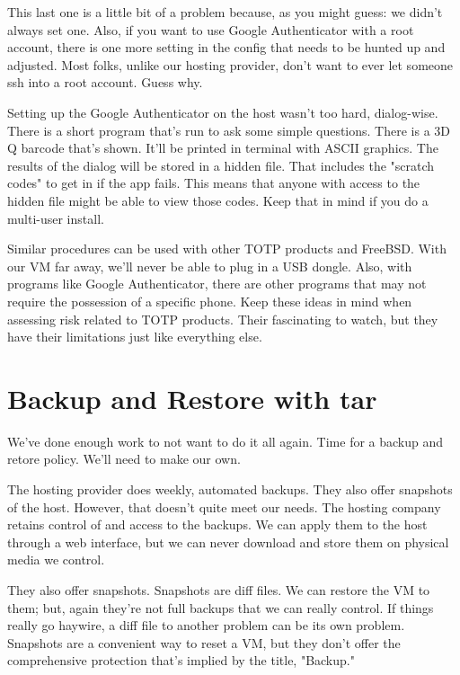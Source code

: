 This last one is a little bit of a problem because, as you might guess:  we didn't always set one.  Also, if you want to use Google Authenticator with a root account, there is one more setting in the config that needs to be hunted up and adjusted.  Most folks, unlike our hosting provider, don't want to ever let someone ssh into a root account.  Guess why.

Setting up the Google Authenticator on the host wasn't too hard, dialog-wise.  There is a short program that's run to ask some simple questions.  There is a 3D Q barcode that's shown.  It'll be printed in terminal with ASCII graphics.  The results of the dialog will be stored in a hidden file.  That includes the "scratch codes" to get in if the app fails.  This means that anyone with access to the hidden file might be able to view those codes.  Keep that in mind if you do a multi-user install.

Similar procedures can be used with other TOTP products and FreeBSD.  With our VM far away, we'll never be able to plug in a USB dongle.  Also, with programs like Google Authenticator, there are other programs that may not require the possession of a specific phone.  Keep these ideas in mind when assessing risk related to TOTP products.  Their fascinating to watch, but they have their limitations just like everything else.

\section{Backup and Restore with tar}


We've done enough work to not want to do it all again.  Time for a \gls{backup} and retore policy.  We'll need to make our own.

The hosting provider does weekly, automated backups.  They also offer snapshots of the host.  However, that doesn't quite meet our needs.  The hosting company retains control of and access to the backups.  We can apply them to the host through a web interface, but we can never download and store them on physical media we control.

They also offer snapshots.  Snapshots are diff files.  We can restore the VM to them; but, again they're not full backups that we can really control.  If things really go haywire, a diff file to another problem can be its own problem.  Snapshots are a convenient way to reset a VM, but they don't offer the comprehensive protection that's implied by the title, "Backup."  

